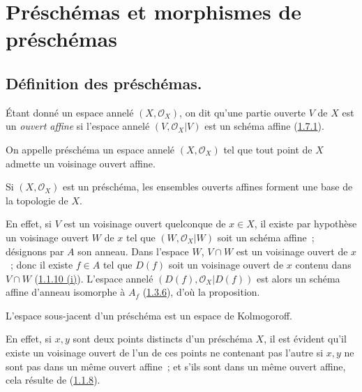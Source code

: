 \section{Préschémas et morphismes de préschémas}
\label{section:I.2-fr}

\subsection{Définition des préschémas.}
\label{subsection:I.2.1-fr}

\begin{env}[2.1.1]
\label{I.2.1.1-fr}
Étant donné un espace annelé $(X,\mathscr{O}_X)$, on dit qu'une partie ouverte
$V$ de $X$ est un \emph{ouvert affine} si l'espace annelé
$(V,\mathscr{O}_X|V)$ est un schéma affine
(\hyperref[I.1.7.1-fr]{1.7.1}).
\end{env}

\begin{definition}[2.1.2]
\label{I.2.1.2-fr}
On appelle préschéma un espace annelé $(X,\mathscr{O}_X)$ tel que tout
point de $X$ admette un voisinage ouvert affine.
\end{definition}


\begin{proposition}[2.1.3]
\label{I.2.1.3-fr}
Si $(X,\mathscr{O}_X)$ est un préschéma, les ensembles ouverts affines forment
une base de la topologie de $X$.
\end{proposition}

En effet, si $V$ est un voisinage ouvert quelconque de $x\in X$, il existe par
hypothèse un voisinage ouvert $W$ de $x$ tel que
$(W,\mathscr{O}_X|W)$ soit un schéma affine~; désignons par $A$ son anneau.
Dans l'espace $W$, $V\cap W$ est un voisinage ouvert de $x$~; donc il existe
$f\in A$ tel que $D(f)$ soit un voisinage ouvert de $x$ contenu dans
$V\cap W$ (\hyperref[I.1.1.10-fr]{1.1.10 (i)}). L'espace annelé
$(D(f),\mathscr{O}_X|D(f))$ est alors un schéma affine d'anneau isomorphe à
$A_f$ (\hyperref[I.1.3.6-fr]{1.3.6}), d'où la proposition.

\begin{proposition}[2.1.4]
\label{I.2.1.4-fr}
L'espace sous-jacent d'un préschéma est un espace de Kolmogoroff.
\end{proposition}

En effet, si $x,y$ sont deux points distincts d'un préschéma $X$, il est
évident qu'il existe un voisinage ouvert de l'un de ces points ne contenant
pas l'autre si $x,y$ ne sont pas dans un même ouvert affine~; et s'ils sont
dans un même ouvert affine, cela résulte de
(\hyperref[I.1.1.8-fr]{1.1.8}).

